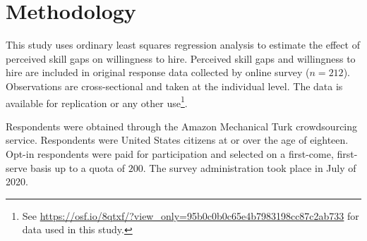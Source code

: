 \documentclass[review]{elsarticle}
\begin{document}

\section{Methodology}


This study uses ordinary least squares regression analysis to estimate the effect of perceived skill gaps on willingness to hire.
Perceived skill gaps and willingness to hire are included in original response data collected by online survey ($n = 212$).
Observations are cross-sectional and taken at the individual level.
The data is available for replication or any other use\footnote{
    See \url{https://osf.io/8qtxf/?view_only=95b0c0b0c65e4b7983198cc87c2ab733}
    for data used in this study.
}.

Respondents were obtained through the Amazon Mechanical Turk crowdsourcing service.
Respondents were United States citizens at or over the age of eighteen.
Opt-in respondents were paid for participation and selected on a first-come, first-serve basis up to a quota of $200$.
The survey administration took place in July of 2020.
\end{document}
